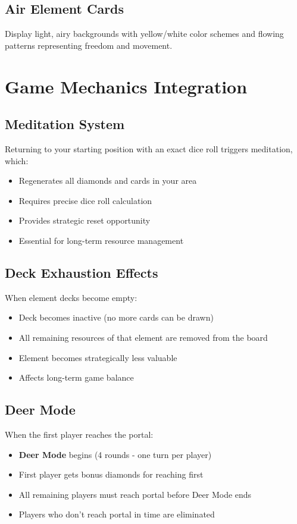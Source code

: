 \documentclass[12pt,a4paper]{article}
\begin{document}
\subsection{\textcolor{airyellow}{Air Element Cards}}
Display light, airy backgrounds with yellow/white color schemes and flowing patterns representing freedom and movement.

\section{Game Mechanics Integration}

\subsection{Meditation System}
Returning to your starting position with an exact dice roll triggers meditation, which:
\begin{itemize}
    \item Regenerates all diamonds and cards in your area
    \item Requires precise dice roll calculation
    \item Provides strategic reset opportunity
    \item Essential for long-term resource management
\end{itemize}

\subsection{Deck Exhaustion Effects}
When element decks become empty:
\begin{itemize}
    \item Deck becomes inactive (no more cards can be drawn)
    \item All remaining resources of that element are removed from the board
    \item Element becomes strategically less valuable
    \item Affects long-term game balance
\end{itemize}

\subsection{Deer Mode}
When the first player reaches the portal:
\begin{itemize}
    \item \textbf{Deer Mode} begins (4 rounds - one turn per player)
    \item First player gets bonus diamonds for reaching first
    \item All remaining players must reach portal before Deer Mode ends
    \item Players who don't reach portal in time are eliminated
\end{itemize}
\end{document}
